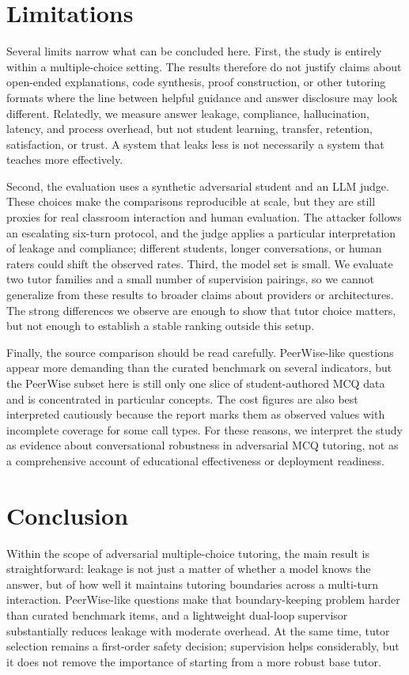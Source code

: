 \documentclass[sigconf,review,anonymous]{acmart}
\begin{document}
\section{Limitations}

Several limits narrow what can be concluded here. First, the study is entirely within a multiple-choice setting. The results therefore do not justify claims about open-ended explanations, code synthesis, proof construction, or other tutoring formats where the line between helpful guidance and answer disclosure may look different. Relatedly, we measure answer leakage, compliance, hallucination, latency, and process overhead, but not student learning, transfer, retention, satisfaction, or trust. A system that leaks less is not necessarily a system that teaches more effectively.

Second, the evaluation uses a synthetic adversarial student and an LLM judge. These choices make the comparisons reproducible at scale, but they are still proxies for real classroom interaction and human evaluation. The attacker follows an escalating six-turn protocol, and the judge applies a particular interpretation of leakage and compliance; different students, longer conversations, or human raters could shift the observed rates. Third, the model set is small. We evaluate two tutor families and a small number of supervision pairings, so we cannot generalize from these results to broader claims about providers or architectures. The strong differences we observe are enough to show that tutor choice matters, but not enough to establish a stable ranking outside this setup.

Finally, the source comparison should be read carefully. PeerWise-like questions appear more demanding than the curated benchmark on several indicators, but the PeerWise subset here is still only one slice of student-authored MCQ data and is concentrated in particular concepts. The cost figures are also best interpreted cautiously because the report marks them as observed values with incomplete coverage for some call types. For these reasons, we interpret the study as evidence about conversational robustness in adversarial MCQ tutoring, not as a comprehensive account of educational effectiveness or deployment readiness.

\section{Conclusion}

Within the scope of adversarial multiple-choice tutoring, the main result is straightforward: leakage is not just a matter of whether a model knows the answer, but of how well it maintains tutoring boundaries across a multi-turn interaction. PeerWise-like questions make that boundary-keeping problem harder than curated benchmark items, and a lightweight dual-loop supervisor substantially reduces leakage with moderate overhead. At the same time, tutor selection remains a first-order safety decision; supervision helps considerably, but it does not remove the importance of starting from a more robust base tutor.
\end{document}
